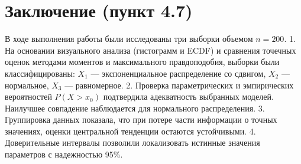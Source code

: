 \documentclass[a4paper,12pt]{article}
\begin{document}
\section{Заключение (пункт 4.7)}
В ходе выполнения работы были исследованы три выборки объемом $n=200$. 
1. На основании визуального анализа (гистограмм и ECDF) и сравнения точечных оценок методами моментов и максимального правдоподобия, выборки были классифицированы: $X_1$ — экспоненциальное распределение со сдвигом, $X_2$ — нормальное, $X_3$ — равномерное.
2. Проверка параметрических и эмпирических вероятностей $P(X > x_0)$ подтвердила адекватность выбранных моделей. Наилучшее совпадение наблюдается для нормального распределения.
3. Группировка данных показала, что при потере части информации о точных значениях, оценки центральной тенденции остаются устойчивыми.
4. Доверительные интервалы позволили локализовать истинные значения параметров с надежностью 95\%.
\end{document}
